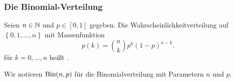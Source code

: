 \subsubsection{Die Binomial-Verteilung}
\begin{definition}\label{def:binomial-verteilung}
    Seien $n\in \mathbb{N}$ und $p\in [0,1]$ gegeben. Die Wahrscheinlichkeitverteilung auf $\left \{0,1,\ldots,n\right\} $ mit Massenfunktion
    \[
        p(k) = \binom{n}{k}p^k(1-p)^{n-k}
    .\] 
    für $k=0,\ldots,n$ heißt . 
\end{definition}
\begin{notation}
    Wir notieren $\operatorname{Bin}(n,p)$ für die Binomialverteilung mit Parametern  $n$ und  $p$.
\end{notation}

